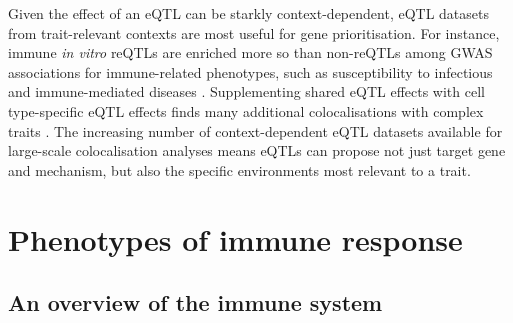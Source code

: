 Given the effect of an \gls{eQTL} can be starkly context-dependent, 
\gls{eQTL} datasets from trait-relevant contexts are most useful for gene prioritisation.
For instance, immune \textit{in vitro} \glspl{reQTL} are enriched more so than non-\glspl{reQTL} among \gls{GWAS} associations for immune-related phenotypes, 
such as susceptibility to infectious \autocite{barreiro2012DecipheringGeneticArchitecture,manry2017DecipheringGeneticControl} and immune-mediated diseases \autocite{manry2017DecipheringGeneticControl,kim-hellmuth2017GeneticRegulatoryEffects}.
Supplementing shared \gls{eQTL} effects with cell type-specific \gls{eQTL} effects finds many additional colocalisations with complex traits \autocite{kundu2020GeneticAssociationsRegulatory,kim-hellmuth2020CellTypeSpecific}.
The increasing number of context-dependent \gls{eQTL} datasets available for large-scale colocalisation analyses means \glspl{eQTL} can propose not just target gene and mechanism, but also the specific environments most relevant to a trait.


\section{Phenotypes of immune response}

\subsection{An overview of the immune system}

